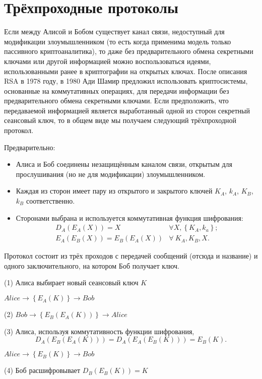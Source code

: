 \section{Трёхпроходные протоколы}

Если между Алисой и Бобом существует канал связи, недоступный для модификации злоумышленником (то есть когда применима модель только пассивного криптоаналитика), то даже без предварительного обмена секретными ключами или другой информацией можно воспользоваться идеями, использованными ранее в криптографии на открытых ключах. После описания RSA в 1978 году, в 1980 Ади Шамир предложил использовать криптосистемы, основанные на коммутативных операциях, для передачи информации без предварительного обмена секретными ключами. Если предположить, что передаваемой информацией является выработанный одной из сторон секретный сеансовый ключ, то в общем виде мы получаем следующий трёхпроходной протокол.

Предварительно:

\begin{itemize}
	\item Алиса и Боб соединены незащищённым каналом связи, открытым для прослушивания (но не для модификации) злоумышленником.
	\item Каждая из сторон имеет пару из открытого и закрытого ключей $K_A$, $k_A$, $K_B$, $k_B$ соответственно.
	\item Сторонами выбрана и используется коммутативная функция шифрования:
	\[\begin{array}{lll}
		D_{A} \left( E_{A} \left( X \right) \right)	= X                                       & \forall X, \left\{ K_A, k_a \right\}; \\
		E_{A} \left( E_{B} \left( X \right) \right)	= E_B \left( E_A \left( X \right) \right) & \forall ~ K_A, K_B, X.
	\end{array}\]
\end{itemize}

Протокол состоит из трёх проходов с передачей сообщений (отсюда и название) и одного заключительного, на котором Боб получает ключ.
\begin{protocol}
    \item[(1)] Алиса выбирает новый сеансовый ключ $K$
    \item[{}] $Alice \to \left\{ E_A \left( K \right) \right\} \to Bob$
    \item[(2)] $Bob \to \left\{ E_B \left( E_A \left( K \right) \right) \right\} \to Alice$
    \item[(3)] Алиса, используя коммутативность функции шифрования,
	\[ D_A \left( E_B \left( E_A \left( K \right) \right) \right) = D_A \left( E_A \left( E_B \left( K \right) \right) \right) = E_B \left( K \right). \]
    \item[{}] $Alice \to \left\{ E_B \left( K \right) \right\} \to Bob$
    \item[(4)] Боб расшифровывает $D_B \left( E_B \left( K \right) \right) = K$
\end{protocol}

